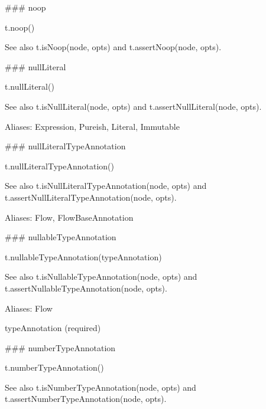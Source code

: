 \#\#\# noop 
\begin{DoxyCode}
t.noop()
\end{DoxyCode}


See also {\ttfamily t.\+is\+Noop(node, opts)} and {\ttfamily t.\+assert\+Noop(node, opts)}.





\#\#\# null\+Literal 
\begin{DoxyCode}
t.nullLiteral()
\end{DoxyCode}


See also {\ttfamily t.\+is\+Null\+Literal(node, opts)} and {\ttfamily t.\+assert\+Null\+Literal(node, opts)}.

Aliases\+: {\ttfamily Expression}, {\ttfamily Pureish}, {\ttfamily Literal}, {\ttfamily Immutable}





\#\#\# null\+Literal\+Type\+Annotation 
\begin{DoxyCode}
t.nullLiteralTypeAnnotation()
\end{DoxyCode}


See also {\ttfamily t.\+is\+Null\+Literal\+Type\+Annotation(node, opts)} and {\ttfamily t.\+assert\+Null\+Literal\+Type\+Annotation(node, opts)}.

Aliases\+: {\ttfamily Flow}, {\ttfamily Flow\+Base\+Annotation}





\#\#\# nullable\+Type\+Annotation 
\begin{DoxyCode}
t.nullableTypeAnnotation(typeAnnotation)
\end{DoxyCode}


See also {\ttfamily t.\+is\+Nullable\+Type\+Annotation(node, opts)} and {\ttfamily t.\+assert\+Nullable\+Type\+Annotation(node, opts)}.

Aliases\+: {\ttfamily Flow}


\begin{DoxyItemize}
\item {\ttfamily type\+Annotation} (required) 


\end{DoxyItemize}

\#\#\# number\+Type\+Annotation 
\begin{DoxyCode}
t.numberTypeAnnotation()
\end{DoxyCode}


See also {\ttfamily t.\+is\+Number\+Type\+Annotation(node, opts)} and {\ttfamily t.\+assert\+Number\+Type\+Annotation(node, opts)}.

